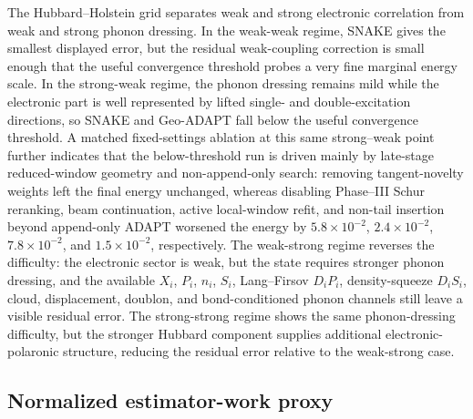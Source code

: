 \documentclass[
  reprint,
  amsmath,
  amssymb,
  aps,
  pra,
  nofootinbib,
  superscriptaddress,
  floatfix
]{revtex4-2}
\begin{document}
\begin{widetext}
The Hubbard--Holstein grid separates weak and strong electronic correlation from weak and strong phonon dressing. In the weak-weak regime, SNAKE gives the smallest displayed error, but the residual weak-coupling correction is small enough that the useful convergence threshold probes a very fine marginal energy scale. In the strong-weak regime, the phonon dressing remains mild while the electronic part is well represented by lifted single- and double-excitation directions, so SNAKE and Geo-ADAPT fall below the useful convergence threshold. A matched fixed-settings ablation at this same strong--weak point further indicates that the below-threshold run is driven mainly by late-stage reduced-window geometry and non-append-only search: removing tangent-novelty weights left the final energy unchanged, whereas disabling Phase--III Schur reranking, beam continuation, active local-window refit, and non-tail insertion beyond append-only ADAPT worsened the energy by \(5.8\times 10^{-2}\), \(2.4\times 10^{-2}\), \(7.8\times 10^{-2}\), and \(1.5\times 10^{-2}\), respectively. The weak-strong regime reverses the difficulty: the electronic sector is weak, but the state requires stronger phonon dressing, and the available \(X_i\), \(P_i\), \(n_i\), \(S_i\), Lang--Firsov \(D_iP_i\), density-squeeze \(D_iS_i\), cloud, displacement, doublon, and bond-conditioned phonon channels still leave a visible residual error. The strong-strong regime shows the same phonon-dressing difficulty, but the stronger Hubbard component supplies additional electronic-polaronic structure, reducing the residual error relative to the weak-strong case.
\end{widetext}

\subsection{Normalized estimator-work proxy}
\end{document}
